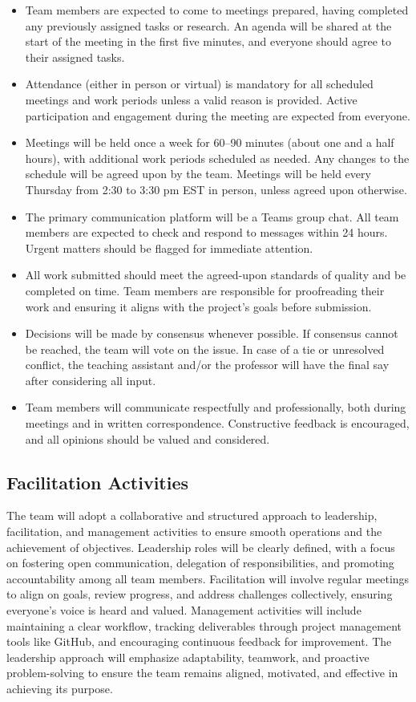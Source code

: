 \documentclass[titlepage]{article}
\begin{document}
\begin{itemize}
  \item Team members are expected to come to meetings prepared, having
    completed any previously assigned tasks or research. An agenda will
    be shared at the start of the
    meeting in the first five minutes, and everyone should agree to their
    assigned tasks.
  \item Attendance (either in person or virtual) is mandatory for all
    scheduled meetings and
    work periods unless a valid reason is provided. Active participation
    and engagement
    during the meeting are expected from everyone.
  \item Meetings will be held once a week for 60–90 minutes (about one and
    a half hours),
    with additional work periods scheduled as needed. Any changes to
    the schedule
    will be agreed upon by the team. Meetings will be held every Thursday
    from 2:30 to
    3:30 pm EST in person, unless agreed upon otherwise.
  \item The primary communication platform will be a Teams group chat. All team
    members are expected to check and respond to messages within 24
    hours. Urgent
    matters should be flagged for immediate attention.
  \item All work submitted should meet the agreed-upon standards of
    quality and be
    completed on time. Team members are responsible for proofreading their
    work and ensuring it aligns with the project’s goals before submission.
  \item Decisions will be made by consensus whenever possible. If
    consensus cannot be
    reached, the team will vote on the issue. In case of a tie or
    unresolved conflict, the
    teaching assistant and/or the professor will have the final say after
    considering all
    input.
  \item Team members will communicate respectfully and
    professionally, both during
    meetings and in written correspondence. Constructive feedback is encouraged,
    and all opinions should be valued and considered.
\end{itemize}

\subsection{Facilitation Activities}
The team will adopt a collaborative and structured approach to
leadership, facilitation, and management activities to ensure smooth
operations and the achievement of objectives. Leadership roles will
be clearly defined, with a focus on fostering open communication,
delegation of responsibilities, and promoting accountability among
all team members. Facilitation will involve regular meetings to align
on goals, review progress, and address challenges collectively,
ensuring everyone’s voice is heard and valued. Management activities
will include maintaining a clear workflow, tracking deliverables
through project management tools like GitHub, and encouraging
continuous feedback for improvement. The leadership approach will
emphasize adaptability, teamwork, and proactive problem-solving to
ensure the team remains aligned, motivated, and effective in
achieving its purpose.
\end{document}
